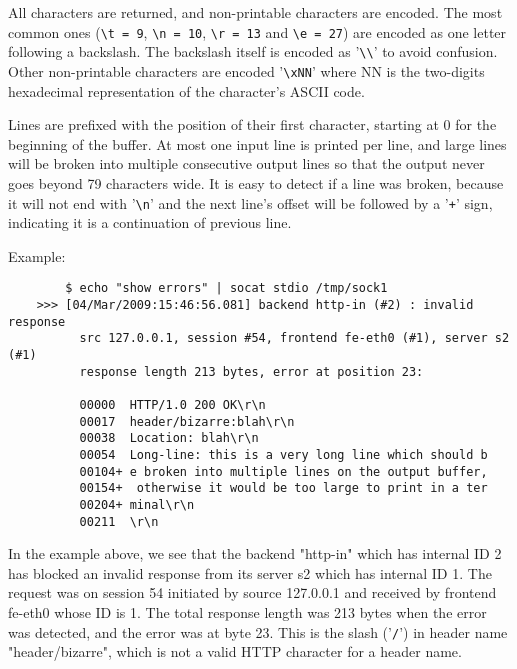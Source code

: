   All characters are returned, and non-printable characters are encoded. The
  most common ones (\verb|\t = 9|, \verb|\n = 10|, \verb|\r = 13| and \verb|\e = 27|) are encoded as one
  letter following a backslash. The backslash itself is encoded as
  '\verb|\\|' to
  avoid confusion. Other non-printable characters are encoded '\verb|\xNN|' where
  NN is the two-digits hexadecimal representation of the character's ASCII
  code.

  Lines are prefixed with the position of their first character, starting at 0
  for the beginning of the buffer. At most one input line is printed per line,
  and large lines will be broken into multiple consecutive output lines so that
  the output never goes beyond 79 characters wide. It is easy to detect if a
  line was broken, because it will not end with '\verb|\n|' and the next line's offset
  will be followed by a '\verb|+|' sign, indicating it is a continuation of previous
  line.

  Example:
  \begin{verbatim}
        $ echo "show errors" | socat stdio /tmp/sock1
    >>> [04/Mar/2009:15:46:56.081] backend http-in (#2) : invalid response
          src 127.0.0.1, session #54, frontend fe-eth0 (#1), server s2 (#1)
          response length 213 bytes, error at position 23:

          00000  HTTP/1.0 200 OK\r\n
          00017  header/bizarre:blah\r\n
          00038  Location: blah\r\n
          00054  Long-line: this is a very long line which should b
          00104+ e broken into multiple lines on the output buffer,
          00154+  otherwise it would be too large to print in a ter
          00204+ minal\r\n
          00211  \r\n
  \end{verbatim}

    In the example above, we see that the backend "http-in" which has internal
    ID 2 has blocked an invalid response from its server s2 which has internal
    ID 1. The request was on session 54 initiated by source 127.0.0.1 and
    received by frontend fe-eth0 whose ID is 1. The total response length was
    213 bytes when the error was detected, and the error was at byte 23. This
    is the slash ('\verb|/|') in header name "header/bizarre", which is not a valid
    HTTP character for a header name.

\subsubsection[show info]{}

